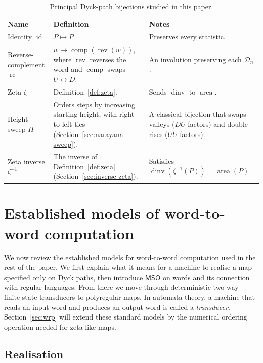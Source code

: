 \documentclass[11pt]{article}
\theoremstyle{definition}
\newcommand{\D}{\mathcal D}
\newcommand{\MSO}{\mathsf{MSO}}
\newcommand{\area}{\operatorname{area}}
\newcommand{\dinv}{\operatorname{dinv}}
\newcommand{\id}{\operatorname{id}}
\newcommand{\rc}{\operatorname{rc}}
\newcommand{\rev}{\operatorname{rev}}
\newcommand{\comp}{\operatorname{comp}}
\begin{document}
\begin{table}[t]
\centering
\small
\renewcommand{\arraystretch}{1.25}
\begin{tabularx}{\textwidth}{@{}>{\raggedright\arraybackslash}p{}
                                   >{\raggedright\arraybackslash}X
                                   >{\raggedright\arraybackslash}X@{}}
\toprule
Name & Definition & Notes \\
\midrule
Identity $\id$ & $P\mapsto P$ & Preserves every statistic. \\
Reverse-complement $\rc$ &
  $w\mapsto \comp(\rev(w))$, where $\rev$ reverses the word and
  $\comp$ swaps $U\leftrightarrow D$. &
  An involution preserving each $\D_n$. \\
Zeta $\zeta$ & Definition~\ref{def:zeta}. &
  Sends $\dinv$ to $\area$. \\
Height sweep $H$ &
  Orders steps by increasing starting height, with right-to-left ties
  (Section~\ref{sec:narayana-sweep}). &
  A classical bijection that swaps valleys ($DU$ factors) and double rises
  ($UU$ factors). \\
Zeta inverse $\zeta^{-1}$ &
  The inverse of Definition~\ref{def:zeta}
  (Section~\ref{sec:inverse-zeta}). &
  Satisfies $\dinv(\zeta^{-1}(P))=\area(P)$. \\
\bottomrule
\end{tabularx}
\caption{Principal Dyck-path bijections studied in this paper.}
\label{tab:named-bijections}
\end{table}

\section{Established models of word-to-word computation}\label{sec:models}

We now review the established models for word-to-word computation used in the
rest of the paper.  We first explain what it means for a machine to realise a
map specified only on Dyck paths, then introduce $\MSO$ on words and its
connection with regular languages.  From there we move through deterministic
two-way finite-state transducers to polyregular maps.  In automata theory, a
machine that reads an input word and produces an output word is called a
\emph{transducer}.  Section~\ref{sec:wrp} will extend these standard models by
the numerical ordering operation needed for zeta-like maps.

\subsection{Realisation}
\end{document}
